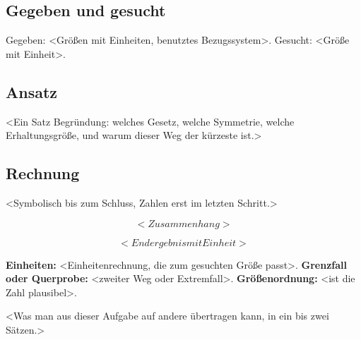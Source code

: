
\subsection*{Gegeben und gesucht}

Gegeben: <Größen mit Einheiten, benutztes Bezugssystem>.
Gesucht: <Größe mit Einheit>.

\subsection*{Ansatz}

<Ein Satz Begründung: welches Gesetz, welche Symmetrie, welche Erhaltungsgröße,
und warum dieser Weg der kürzeste ist.>

\subsection*{Rechnung}

<Symbolisch bis zum Schluss, Zahlen erst im letzten Schritt.>

\begin{equation}
  <Zusammenhang>
\end{equation}

\begin{ergebnis}
\begin{equation*}
  <Endergebnis mit Einheit>
\end{equation*}
\end{ergebnis}

\begin{kontrolle}
\textbf{Einheiten:} <Einheitenrechnung, die zum gesuchten Größe passt>.
\textbf{Grenzfall oder Querprobe:} <zweiter Weg oder Extremfall>.
\textbf{Größenordnung:} <ist die Zahl plausibel>.
\end{kontrolle}

\begin{merksatz}
<Was man aus dieser Aufgabe auf andere übertragen kann, in ein bis zwei Sätzen.>
\end{merksatz}
